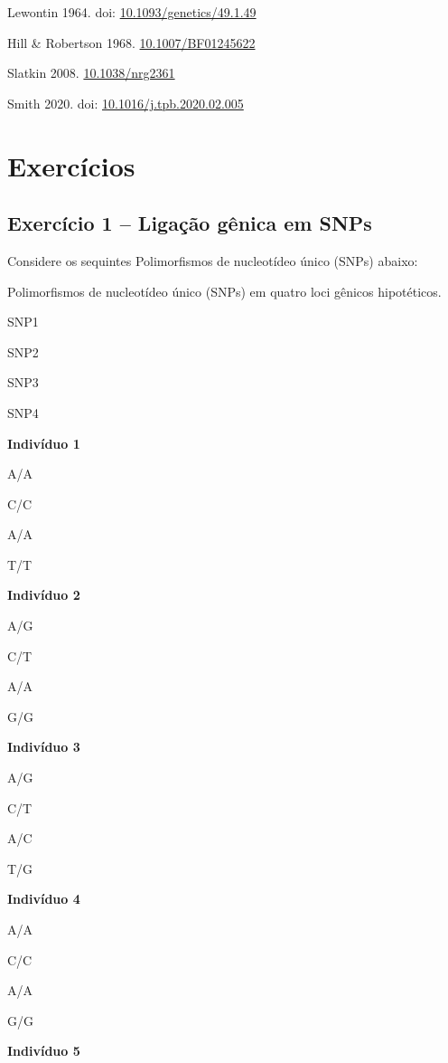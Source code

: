\documentclass[
]{book}
\begin{document}
Lewontin 1964. doi: \href{https://doi.org/10.1093/genetics/49.1.49}{10.1093/genetics/49.1.49}

Hill \& Robertson 1968. \href{https://doi.org/10.1007/BF01245622}{10.1007/BF01245622}

Slatkin 2008. \href{https://doi.org/10.1038/nrg2361}{10.1038/nrg2361}

Smith 2020. doi: \href{https://doi.org/10.1016/j.tpb.2020.02.005}{10.1016/j.tpb.2020.02.005}

\hypertarget{exercuxedcios-1}{%
\section{Exercícios}\label{exercuxedcios-1}}

\hypertarget{exercuxedcio-1-ligauxe7uxe3o-guxeanica-em-snps}{%
\subsection{Exercício 1 -- Ligação gênica em SNPs}\label{exercuxedcio-1-ligauxe7uxe3o-guxeanica-em-snps}}

Considere os sequintes Polimorfismos de nucleotídeo único (SNPs) abaixo:

\label{tab:tableD05}Polimorfismos de nucleotídeo único (SNPs) em quatro loci gênicos hipotéticos.

SNP1

SNP2

SNP3

SNP4

\textbf{Indivíduo 1}

A/A

C/C

A/A

T/T

\textbf{Indivíduo 2}

A/G

C/T

A/A

G/G

\textbf{Indivíduo 3}

A/G

C/T

A/C

T/G

\textbf{Indivíduo 4}

A/A

C/C

A/A

G/G

\textbf{Indivíduo 5}
\end{document}
